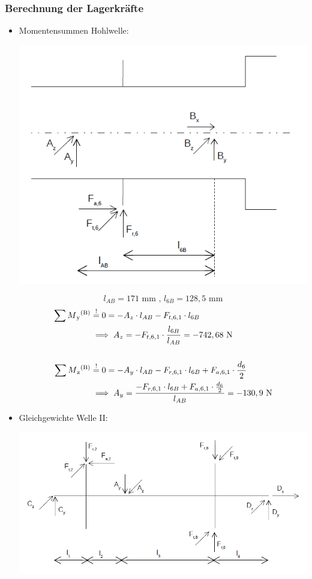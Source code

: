 \subsubsection{Berechnung der Lagerkräfte}
\begin{itemize}
\item Momentensummen Hohlwelle:
\begin{center}
	\includegraphics[width=1\textwidth,keepaspectratio]{figures/Gang1Hohl.png}
\end{center}
\[l_{AB} =171\text{ mm} \text{ , } l_{6B} = 128,5\text{ mm}\]
\begin{align*}
	\sum M\textsubscript{y}\textsuperscript{(B)} &\overset{!}{=} 0 = -A_z \cdot l_{AB} - F_{t,6,1} \cdot l_{6B} \\
	&\implies A_z = -F_{t,6,1} \cdot \frac{l_{6B}}{l_{AB}} = -742,68 \text{ N} \\ \\
	\sum M\textsubscript{z}\textsuperscript{(B)} &\overset{!}{=} 0 = -A_y \cdot l_{AB} - F_{r,6,1} \cdot l_{6B} + F_{a,6,1} \cdot \frac{d_6}{2}\\
	&\implies A_y = \frac{-F_{r,6,1} \cdot l_{6B} + F_{a,6,1} \cdot \frac{d_6}{2}} {l_{AB}}= -130,9 \text{ N} 
\end{align*}
\item Gleichgewichte Welle II:
\begin{center}
	\includegraphics[width=1.04\textwidth,keepaspectratio]{figures/Gang1.png}

\end{center}
\end{itemize}
